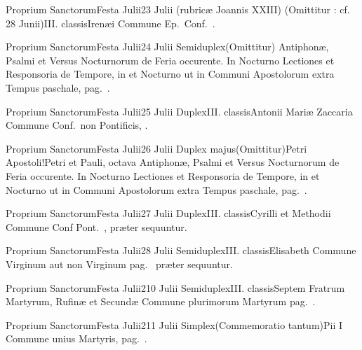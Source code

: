 \documentclass[nocturnale-romanum.tex]{subfiles}
\begin{document}
	{Proprium Sanctorum}{Festa Julii}{2}{3 Julii (rubricæ Joannis XXIII)}
	{(Omittitur : cf. 28 Junii)}{III. classis}{Irenæi}
	{}
	{Commune Ep.\ Conf.\ \pageref{M-COPO}.}

	{Proprium Sanctorum}{Festa Julii}{2}{4 Julii}
	{Semiduplex}{(Omittitur)}{}
	{Antiphonæ, Psalmi et Versus Nocturnorum de Feria occurente. In  Nocturno Lectiones et Responsoria de Tempore, in  et  Nocturno ut in Communi Apostolorum extra Tempus paschale, pag.\ \pageref{M-APEXN2R1}.}
	{}

	{Proprium Sanctorum}{Festa Julii}{2}{5 Julii}
	{Duplex}{III. classis}{Antonii Mariæ Zaccaria}
	{Commune Conf.\ non Pontificis, \pageref{M-CONP}.}
	{}

	{Proprium Sanctorum}{Festa Julii}{2}{6 Julii}
	{Duplex majus}{(Omittitur)}{Petri Apostoli!Petri et Pauli, octava}
	{Antiphonæ, Psalmi et Versus Nocturnorum de Feria occurente. In  Nocturno Lectiones et Responsoria de Tempore, in  et  Nocturno ut in Communi Apostolorum extra Tempus paschale, pag.\ \pageref{M-APEXN2R1}.}
	{}

	{Proprium Sanctorum}{Festa Julii}{2}{7 Julii}
	{Duplex}{III. classis}{Cyrilli et Methodii}
	{Commune Conf Pont.\ \pageref{M-COPO}, præter sequuntur.}
	{}

	{Proprium Sanctorum}{Festa Julii}{2}{8 Julii}
	{Semiduplex}{III. classis}{Elisabeth}
	{Commune Virginum aut non Virginum pag.\ \pageref{M-MU} præter sequuntur.}
	{}

	{Proprium Sanctorum}{Festa Julii}{2}{10 Julii}
	{Semiduplex}{III. classis}{Septem Fratrum Martyrum, Rufinæ et Secundæ}
	{Commune plurimorum Martyrum pag.\ \pageref{M-PMEX}.}
	{}

	{Proprium Sanctorum}{Festa Julii}{2}{11 Julii}
	{Simplex}{(Commemoratio tantum)}{Pii I}
	{Commune unius Martyris, pag.\ \pageref{M-UMEX}.}
	{}
\end{document}
